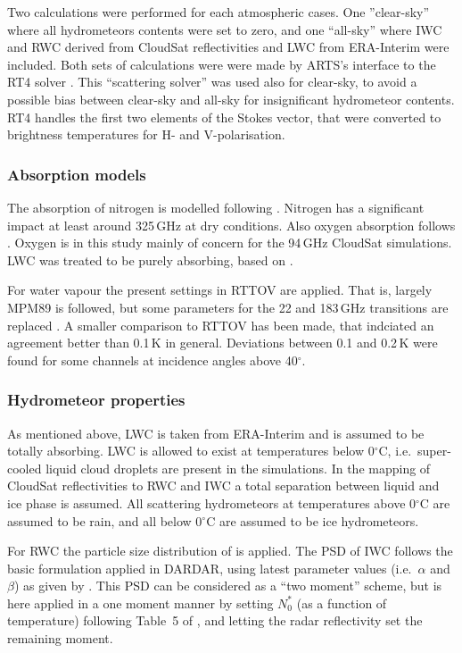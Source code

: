 \documentclass[12pt]{article}
\begin{document}
Two calculations were performed for each atmospheric cases. One ''clear-sky''
where all hydrometeors contents were set to zero, and one ``all-sky'' where IWC
and RWC derived from CloudSat reflectivities and LWC from ERA-Interim were
included. Both sets of calculations were were made by ARTS's interface to the
RT4 solver \citep{evans1995microwavec}. This ``scattering solver'' was used
also for clear-sky, to avoid a possible bias between clear-sky and all-sky for
insignificant hydrometeor contents. RT4 handles the first two elements of the
Stokes vector, that were converted to brightness temperatures for H- and
V-polarisation.


\subsubsection{Absorption models}
%
The absorption of nitrogen is modelled following \citet{pwr:93}. Nitrogen has a
significant impact at least around 325\,GHz at dry conditions. Also oxygen
absorption follows \citet{pwr:93}. Oxygen is in this study mainly of concern
for the 94\,GHz CloudSat simulations. LWC was treated to be
purely absorbing, based on \citet{ellison2007permittivity}.

For water vapour the present settings in RTTOV are applied. That is, largely
MPM89 \citep{liebe:89} is followed, but some parameters for the 22 and 183\,GHz
transitions are replaced \citep{saunders2018update,turner2019amsutran}. A
smaller comparison to RTTOV has been made, that indciated an agreement better
than 0.1\,K in general. Deviations between 0.1 and 0.2\,K were found for some
channels at incidence angles above 40$^\circ$.


\subsubsection{Hydrometeor properties}
%
As mentioned above, LWC is taken from ERA-Interim and is assumed to be totally
absorbing. LWC is allowed to exist at temperatures below 0$^\circ$C, i.e.\
super-cooled liquid cloud droplets are present in the simulations. In the
mapping of CloudSat reflectivities to RWC and IWC a total separation between
liquid and ice phase is assumed. All scattering hydrometeors at temperatures
above 0$^\circ$C are assumed to be rain, and all below 0$^\circ$C are assumed
to be ice hydrometeors.

For RWC the particle size distribution of \citet{abel2012improved} is applied.
The PSD of IWC follows the basic formulation applied in DARDAR, using latest
parameter values (i.e.\ $\alpha$ and $\beta$) as given by
\citet{amt-12-2819-2019}. This PSD can be considered as a ``two moment''
scheme, but is here applied in a one moment manner by setting $N_0^*$ (as a
function of temperature) following Table~5 of \citet{delanoe2014normalized},
and letting the radar reflectivity set the remaining moment.
\end{document}
